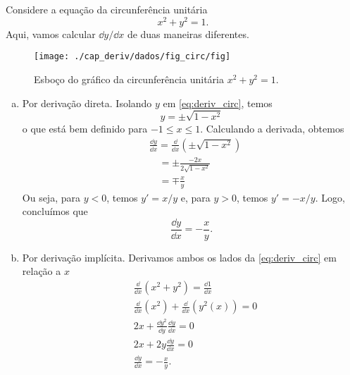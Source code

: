 \begin{ex}\label{ex:derivimp_cric}
  Considere a equação da circunferência unitária
  \begin{equation}\label{eq:deriv_circ}
    x^2 + y^2 = 1.
  \end{equation}
  Aqui, vamos calcular $\dd y/\dd x$ de duas maneiras diferentes.

  \begin{figure}[H]
    \centering
    \texttt{[image: ./cap\_deriv/dados/fig\_circ/fig]}
    \caption{Esboço do gráfico da circunferência unitária $x^2 + y^2 = 1$.}
    \label{fig:circ}
  \end{figure}

  \begin{enumerate}[a)]
  \item Por derivação direta. Isolando $y$ em \eqref{eq:deriv_circ}, temos
    \begin{equation}
      y = \pm \sqrt{1 - x^2}
    \end{equation}
    o que está bem definido para $-1\leq x \leq 1$. Calculando a derivada, obtemos
    \begin{align}
      & \frac{\dd y}{\dd x} = \frac{\dd}{\dd x}\left(\pm\sqrt{1 - x^2}\right)\\
      & \text{}\quad = \pm\frac{-2x}{2\sqrt{1-x^2}}\\
      & \text{}\quad = \mp \frac{x}{y}
    \end{align}
    Ou seja, para $y < 0$, temos $y' = x/y$ e, para $y>0$, temos $y' = -x/y$. Logo, concluímos que
    \begin{equation}
      \frac{\dd y}{\dd x} = -\frac{x}{y}.
    \end{equation}
  \item Por derivação implícita. Derivamos ambos os lados da \eqref{eq:deriv_circ} em relação a $x$
    \begin{align}
      & \frac{\dd}{\dd x}\left(x^2+y^2\right) = \frac{\dd 1}{\dd x} \\
      & \frac{\dd}{\dd x}\left(x^2\right) + \frac{\dd}{\dd x}\left(y^2(x)\right) = 0\\
      & 2x + \frac{\dd y^2}{\dd y}\frac{\dd y}{\dd x} = 0\\
      & 2x + 2y\frac{\dd y}{\dd x} = 0\\
      & \frac{\dd y}{\dd x} = -\frac{x}{y}.
    \end{align}
  \end{enumerate}
\end{ex}

